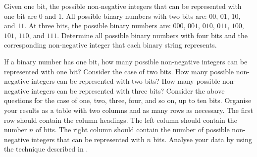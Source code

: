 \documentclass[a4paper,oneside,12pt]{article}
\begin{document}
\begin{problem}
\begin{packedenum}
  \item\label{subprob:binary_4_bits}
    Given one bit, the possible non-negative integers that can be
    represented with one bit are $0$ and $1$.  All possible binary
    numbers with two bits are: $00$, $01$, $10$, and $11$.  At three
    bits, the possible binary numbers are: $000$, $001$, $010$, $011$,
    $100$, $101$, $110$, and $111$.  Determine all possible binary
    numbers with four bits and the corresponding non-negative integer
    that each binary string represents.

  \item\label{subprob:binary_how_many_integers}
    If a binary number has one bit, how many possible non-negative
    integers can be represented with one bit?  Consider the case of
    two bits.  How many possible non-negative integers can be
    represented with two bits?  How many possible non-negative
    integers can be represented with three bits?  Consider the above
    questions for the case of one, two, three, four, and so on, up to
    ten bits.  Organise your results as a table with two columns and
    as many rows as necessary.  The first row should contain the
    column headings.  The left column should contain the number $n$ of
    bits.  The right column should contain the number of possible
    non-negative integers that can be represented with $n$ bits.
    Analyse your data by using the technique described in
    .


\end{packedenum}
\end{problem}
\end{document}
